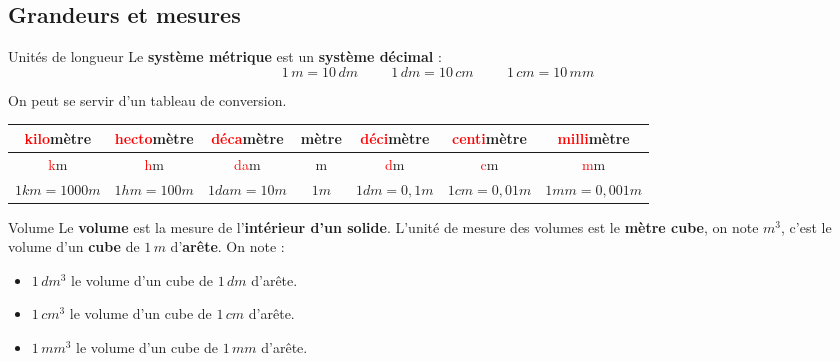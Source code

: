 \begin{pageCours} %


\section{Grandeurs et mesures}

\begin{DefT}{Unités de longueur}
Le \textbf{système métrique} est un \textbf{système décimal} :\\
\[1\, m=10\, dm \hspace{1cm} 1\, dm=10\, cm \hspace{1cm}1\, cm=10\, mm\]
\end{DefT}

\begin{Mt}
On peut se servir d'un tableau de conversion.
\begin{center}
\begin{tabular}{c|c|c|c|c|c|c}
    \textcolor{red}{kilo}mètre & \textcolor{red}{hecto}mètre & \textcolor{red}{déca}mètre & mètre & \textcolor{red}{déci}mètre & \textcolor{red}{centi}mètre & \textcolor{red}{milli}mètre  \\ \hline 
    \textcolor{red}{k}m & \textcolor{red}{h}m & \textcolor{red}{da}m & m & \textcolor{red}{d}m & \textcolor{red}{c}m & \textcolor{red}{m}m \\ \hline
    \(1 km = 1 000 m\) & \(1 hm = 100 m\) & \(1 dam = 10 m\) & \(1 m\) & \(1 dm = 0,1 m\) & \(1 cm = 0,01 m\) & \(1 mm = 0,001 m\)
\end{tabular}
\end{center}
\end{Mt}


\begin{DefT}{Volume}
Le \textbf{volume} est la mesure de l'\textbf{intérieur d'un solide}. L'unité de mesure des volumes est le \textbf{mètre cube}, on note $m^3$, c'est le volume d'un \textbf{cube} de $1\,m$ d'\textbf{arête}. On note :
\begin{itemize}
\item $1\,dm^3$ le volume d'un cube de $1\,dm$ d'arête.
\item $1\,cm^3$ le volume d'un cube de $1\,cm$ d'arête.
\item $1\,mm^3$ le volume d'un cube de $1\,mm$ d'arête.
\end{itemize}
\end{DefT}


\end{pageCours}
